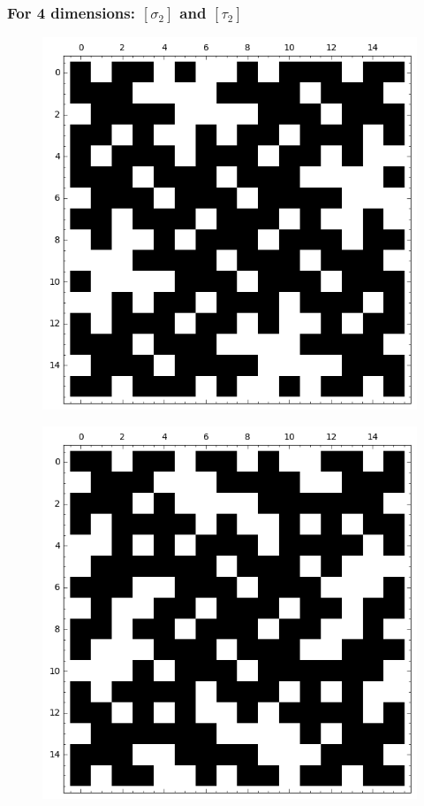 \documentclass[pdf,sprung,slideColor,nocolorBG]{beamer}
\newenvironment{colortheme}[1]{
\def\ProvidesPackageRCS $##1${\relax}
\renewcommand{\ProcessOptions}{\relax}
\makeatletter

\makeatother
}{}
\begin{document}
\begin{colortheme}{jubata}
\begin{frame}
\begin{figure}
\begin{minipage}{.48\textwidth}
  \label{fig:tau_1_bent_cayley_graph_index_matrix}
\end{minipage}
\end{figure}
\end{frame}

\begin{frame}
\frametitle{For 4 dimensions: $[\sigma_2]$ and $[\tau_2]$}
\begin{figure}
\centering
\begin{minipage}{.48\textwidth}
  \centering
  \includegraphics[width=.9\linewidth]{../matrix_plot/sigma_2_bent_cayley_graph_index_matrix.png}
  \label{fig:sigma_2_bent_cayley_graph_index_matrix}
\end{minipage}%
\begin{minipage}{.48\textwidth}
  \centering
  \includegraphics[width=.9\linewidth]{../matrix_plot/tau_2_bent_cayley_graph_index_matrix.png}

\end{minipage}
\end{figure}
\end{frame}
\end{colortheme}
\end{document}
